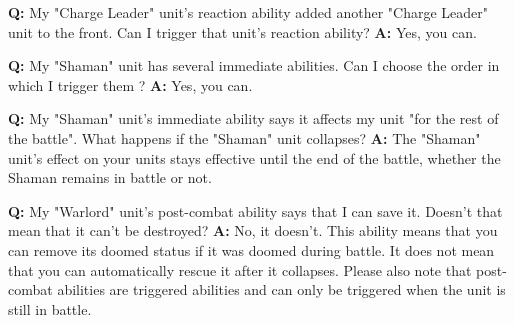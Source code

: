 \documentclass[a4paper]{article}
\begin{document}
    \hspace{-2em}
    \textbf{Q:} My "Charge Leader" unit's reaction ability added another
    "Charge Leader" unit to the front. Can I trigger that unit's reaction ability?
    \newline
    \textbf{A:} Yes, you can.
    
    \hspace{-2em}
    \textbf{Q:} My "Shaman" unit has several immediate abilities. Can I choose the order
    in which I trigger them ?
    \newline
    \textbf{A:} Yes, you can.
    
    \hspace{-2em}
    \textbf{Q:} My "Shaman" unit's immediate ability says it affects my unit "for the
    rest of the battle". What happens if the "Shaman" unit collapses?
    \newline
    \textbf{A:} The "Shaman" unit's effect on your units stays effective until
    the end of the battle, whether the Shaman remains in battle or not.
    
\newpage
    \hspace{-2em}
    \textbf{Q:} My "Warlord" unit's post-combat ability says that I can save it.
    Doesn't that mean that it can't be destroyed?
    \newline
    \textbf{A:} No, it doesn't. This ability means that you can remove its doomed status
    if it was doomed during battle.
    It does not mean that you can automatically rescue it after it collapses.
    Please also note that post-combat abilities are triggered abilities and can only
    be triggered when the unit is still in battle.
    
    
    
\end{document}
